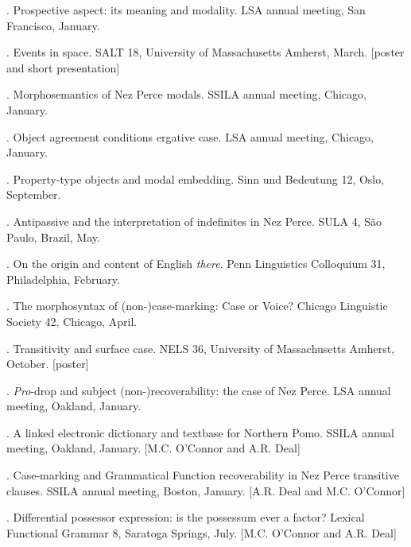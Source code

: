 \documentclass[12pt]{article}
\begin{document}
. Prospective aspect: its meaning and modality. LSA annual meeting, San Francisco, January.

. Events in space. SALT 18, University of Massachusetts Amherst, March. [poster and short presentation]

. Morphosemantics of Nez Perce modals. SSILA annual meeting, Chicago, January.

. Object agreement conditions ergative case. LSA annual meeting, Chicago, January.


. Property-type objects and modal embedding. Sinn und Bedeutung 12, Oslo, September.

. Antipassive and the interpretation of indefinites in Nez Perce. SULA 4, S\~ao Paulo, Brazil, May.

. On the origin and content of English \emph{there}. Penn Linguistics Colloquium 31, Philadelphia, February.

. The morphosyntax of (non-)case-marking: Case or Voice? Chicago Linguistic Society 42, Chicago, April.

. Transitivity and surface case. NELS 36, University of Massachusetts Amherst, October. [poster] 

. \emph{Pro}-drop and subject (non-)recoverability: the case of Nez Perce. LSA annual meeting, Oakland, January.

. A linked electronic dictionary and textbase for Northern Pomo. SSILA annual meeting, Oakland, January. [M.C. O'Connor and A.R. Deal]




. Case-marking and Grammatical Function recoverability in Nez Perce transitive clauses. SSILA annual meeting, Boston, January. [A.R. Deal and M.C. O'Connor]

. Differential possessor expression: is the possessum ever a factor?  Lexical Functional Grammar 8, Saratoga Springs, July. [M.C. O'Connor and A.R. Deal] 








\bigskip




\medskip
\end{document}
